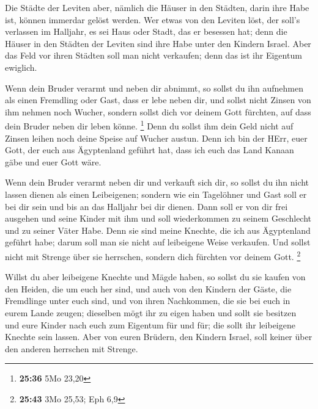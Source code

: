  Die Städte der Leviten aber, nämlich die Häuser in den
Städten, darin ihre Habe ist, können immerdar gelöst werden.
 Wer etwas von den Leviten löst, der soll's verlassen im
Halljahr, es sei Haus oder Stadt, das er besessen hat; denn die Häuser
in den Städten der Leviten sind ihre Habe unter den Kindern Israel.
 Aber das Feld vor ihren Städten soll man nicht verkaufen;
denn das ist ihr Eigentum ewiglich.

 Wenn dein Bruder verarmt und neben dir abnimmt, so sollst
du ihn aufnehmen als einen Fremdling oder Gast, dass er lebe neben dir,
 und sollst nicht Zinsen von ihm nehmen noch Wucher,
sondern sollst dich vor deinem Gott fürchten, auf dass dein Bruder neben
dir leben könne. \footnote{\textbf{25:36} 5Mo 23,20}  Denn
du sollst ihm dein Geld nicht auf Zinsen leihen noch deine Speise auf
Wucher austun.  Denn ich bin der HErr, euer Gott, der euch
aus Ägyptenland geführt hat, dass ich euch das Land Kanaan gäbe und euer
Gott wäre.

 Wenn dein Bruder verarmt neben dir und verkauft sich dir,
so sollst du ihn nicht lassen dienen als einen Leibeigenen;
 sondern wie ein Tagelöhner und Gast soll er bei dir sein
und bis an das Halljahr bei dir dienen.  Dann soll er von
dir frei ausgehen und seine Kinder mit ihm und soll wiederkommen zu
seinem Geschlecht und zu seiner Väter Habe.  Denn sie sind
meine Knechte, die ich aus Ägyptenland geführt habe; darum soll man sie
nicht auf leibeigene Weise verkaufen.  Und sollst nicht mit
Strenge über sie herrschen, sondern dich fürchten vor deinem Gott.
\footnote{\textbf{25:43} 3Mo 25,53; Eph 6,9}

 Willst du aber leibeigene Knechte und Mägde haben, so
sollst du sie kaufen von den Heiden, die um euch her sind, 
und auch von den Kindern der Gäste, die Fremdlinge unter euch sind, und
von ihren Nachkommen, die sie bei euch in eurem Lande zeugen; dieselben
mögt ihr zu eigen haben  und sollt sie besitzen und eure
Kinder nach euch zum Eigentum für und für; die sollt ihr leibeigene
Knechte sein lassen. Aber von euren Brüdern, den Kindern Israel, soll
keiner über den anderen herrschen mit Strenge.

